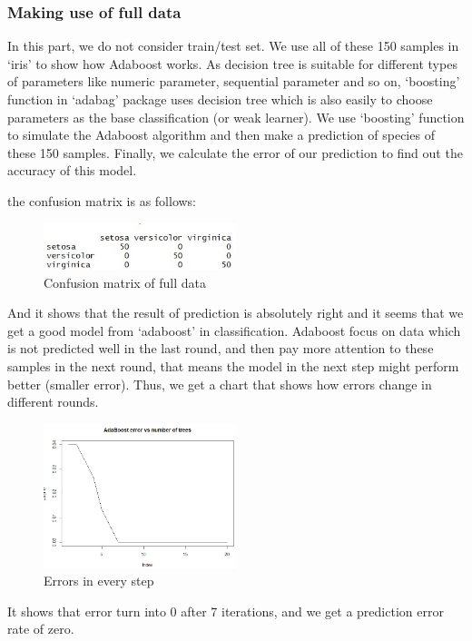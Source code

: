 \documentclass[../SMLreport_template.tex]{subfiles}
\begin{document}
\subsubsection{Making use of full data}
In this part, we do not consider train/test set. We use all of these 150 samples in ‘iris’ to show how Adaboost works. As decision tree is suitable for different types of parameters like numeric parameter, sequential parameter and so on, ‘boosting’ function in ‘adabag’ package uses decision tree which is also easily to choose parameters as the base classification (or weak learner). 
We use ‘boosting’ function to simulate the Adaboost algorithm and then make a prediction of species of these 150 samples. Finally, we calculate the error of our prediction to find out the accuracy of this model.\par
the confusion matrix is as follows:
 \begin{figure}[t]
    \centering
    \includegraphics[width=0.5\textwidth]{sections/images/CM_of_full.jpg}
    \caption{Confusion matrix of full data}
\end{figure}
And it shows that the result of prediction is absolutely right and it seems that we get a good model from ‘adaboost’ in classification. 
Adaboost focus on data which is not predicted well in the last round, and then pay more attention to these samples in the next round, that means the model in the next step might perform better (smaller error). Thus, we get a chart that shows how errors change in different rounds.\par
 \begin{figure}[t]
    \centering
    \includegraphics[width=0.5\textwidth]{sections/images/Errors.jpg}
    \caption{Errors in every step}
\end{figure}
It shows that error turn into 0 after 7 iterations, and we get a prediction error rate of zero.\par
\end{document}

